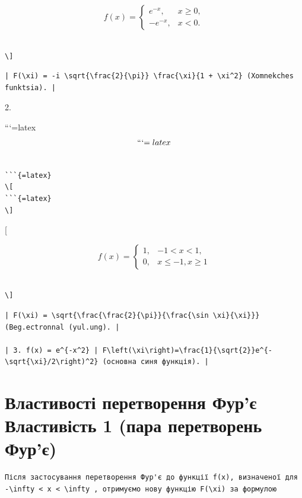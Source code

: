 \documentclass[
]{article}
\begin{document}
\[
f(x) = \begin{cases} e^{-x}, & x \ge 0, \\ -e^{-x}, & x < 0. \end{cases}
\]

\begin{verbatim}

\]
\end{verbatim}

\begin{verbatim}
| F(\xi) = -i \sqrt{\frac{2}{\pi}} \frac{\xi}{1 + \xi^2} (Xomnekches funktsia). |
\end{verbatim}

2.

```{=latex}
\[
```{=latex}
\]

\begin{verbatim}

```{=latex}
\[
```{=latex}
\]
\end{verbatim}

{[}

\[
f(x) = \begin{cases} 1, & -1 < x < 1, \\ 0, & x \le -1, x \ge 1 \end{cases}
\]

\begin{verbatim}

\]
\end{verbatim}

\begin{verbatim}
| F(\xi) = \sqrt{\frac{\frac{2}{\pi}}{\frac{\sin \xi}{\xi}}} (Beg.ectronnal (yul.ung). |

| 3. f(x) = e^{-x^2} | F\left(\xi\right)=\frac{1}{\sqrt{2}}e^{-\sqrt{\xi}/2\right)^2} (основна синя функція). |
\end{verbatim}

\section{Властивості перетворення Фур'є Властивість 1 (пара перетворень
Фур'є)}\label{ux432ux43bux430ux441ux442ux438ux432ux43eux441ux442ux456-ux43fux435ux440ux435ux442ux432ux43eux440ux435ux43dux43dux44f-ux444ux443ux440ux454-ux432ux43bux430ux441ux442ux438ux432ux456ux441ux442ux44c-1-ux43fux430ux440ux430-ux43fux435ux440ux435ux442ux432ux43eux440ux435ux43dux44c-ux444ux443ux440ux454}

\begin{verbatim}
Після застосування перетворення Фур'є до функції f(x), визначеної для -\infty < x < \infty , отримуємо нову функцію F(\xi) за формулою
\end{verbatim}
\end{document}
